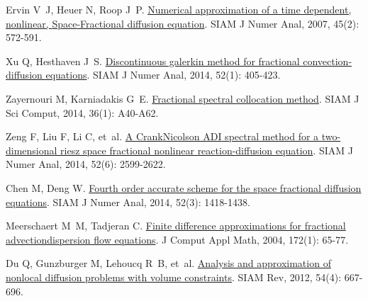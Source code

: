 \begin{thebibliography}{79}
    Ervin V~J, Heuer N, Roop J~P.
    \newblock \href{https://doi.org/10.1137/050642757}{Numerical approximation of a time dependent, nonlinear, {{Space}}-{{Fractional}} diffusion equation}\allowbreak[J].
    \newblock SIAM J Numer Anal, 2007, 45\allowbreak (2): 572-591.
    
    Xu Q, Hesthaven J~S.
    \newblock \href{https://doi.org/10.1137/130918174}{Discontinuous galerkin method for fractional convection-diffusion equations}\allowbreak[J].
    \newblock SIAM J Numer Anal, 2014, 52\allowbreak (1): 405-423.
    
    Zayernouri M, Karniadakis G~E.
    \newblock \href{https://doi.org/10.1137/130933216}{Fractional spectral collocation method}\allowbreak[J].
    \newblock SIAM J Sci Comput, 2014, 36\allowbreak (1): A40-A62.
    
    Zeng F, Liu F, Li C, et~al.
    \newblock \href{https://doi.org/10.1137/130934192}{A {{Crank}}{\textendash}{{Nicolson ADI}} spectral method for a two-dimensional riesz space fractional nonlinear reaction-diffusion equation}\allowbreak[J].
    \newblock SIAM J Numer Anal, 2014, 52\allowbreak (6): 2599-2622.
    
    Chen M, Deng W.
    \newblock \href{https://doi.org/10.1137/130933447}{Fourth order accurate scheme for the space fractional diffusion equations}\allowbreak[J].
    \newblock SIAM J Numer Anal, 2014, 52\allowbreak (3): 1418-1438.
    
    Meerschaert M~M, Tadjeran C.
    \newblock \href{https://www.sciencedirect.com/science/article/pii/S0377042704000986}{Finite difference approximations for fractional advection{\textendash}dispersion flow equations}\allowbreak[J].
    \newblock J Comput Appl Math, 2004, 172\allowbreak (1): 65-77.
    
    Du Q, Gunzburger M, Lehoucq R~B, et~al.
    \newblock \href{https://doi.org/10.1137/110833294}{Analysis and approximation of nonlocal diffusion problems with volume constraints}\allowbreak[J].
    \newblock SIAM Rev, 2012, 54\allowbreak (4): 667-696.
    

\end{thebibliography}
